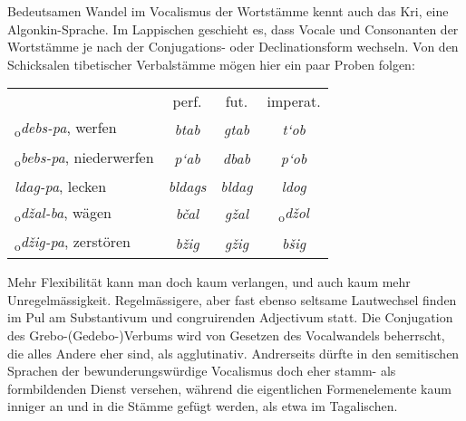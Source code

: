 \label{sp.391}
 
Bedeutsamen Wandel im Vocalismus der Wortstämme kennt auch das Kri, eine Algonkin-Sprache. Im Lappischen geschieht es, dass Vocale und Consonanten der Wortstämme je nach der Conjugations- oder Declinationsform wechseln.  Von den Schicksalen tibetischer Verbalstämme mögen hier ein paar Proben folgen:

\clearpage
\begin{table}[h]
\centering
\tabcolsep=3mm
\begin{tabular}{l c c c}
& perf. & fut. & imperat. \\
\textsubscript{o}\textit{debs-pa}, werfen & \textit{btab} & \textit{gtab} & \textit{t‘ob} \\
\textsubscript{o}\textit{bebs-pa}, niederwerfen & \textit{p‘ab} & \textit{dbab} & \textit{p‘ob} \\
\textit{ldag-pa}, lecken & \textit{bldags} & \textit{bldag} & \textit{ldog} \\
\textsubscript{o}\textit{džal-ba}, wägen & \textit{bčal} & \textit{gžal} & \textsubscript{o}\textit{džol} \\
\textsubscript{o}\textit{džig-pa}, zerstören & \textit{bžig} & \textit{gžig} & \textit{bšig}
\end{tabular}
\end{table}

\noindent Mehr Flexibilität kann man doch kaum verlangen, und auch kaum mehr Unregelmässigkeit. Regelmässigere, aber fast ebenso seltsame Lautwechsel finden im Pul am Substantivum und congruirenden Adjectivum statt. Die Conjugation des Grebo-(Gedebo-)Verbums wird von Gesetzen des Vocalwandels beherrscht, die alles Andere eher sind, als agglutinativ. Andrerseits dürfte in den semitischen Sprachen der bewunderungswürdige Vocalismus doch eher stamm- als formbildenden Dienst versehen, während die eigentlichen Formenelemente kaum inniger an und in die Stämme gefügt werden, als etwa im Tagalischen.

